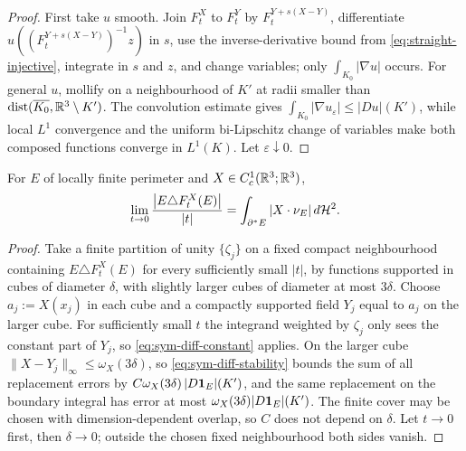 \begin{proof}
First take $u$ smooth.  Join $F^X_t$ to $F^Y_t$ by $F^{Y+s(X-Y)}_t$,
differentiate $u((F^{Y+s(X-Y)}_t)^{-1}z)$ in $s$, use the inverse-derivative
bound from \eqref{eq:straight-injective}, integrate in $s$ and $z$, and change
variables; only $\int_{K_0}|\nabla u|$ occurs.  For general $u$, mollify on a
neighbourhood of $K'$ at radii smaller than
$\operatorname{dist}(\overline{K_0},\mathbb R^3\setminus K')$.  The convolution estimate gives
$\int_{K_0}|\nabla u_\varepsilon|\le |Du|(K')$, while local $L^1$
convergence and the uniform bi-Lipschitz change of variables make both
composed functions converge in $L^1(K)$.  Let $\varepsilon\downarrow0$.
\end{proof}

\begin{theorem}\label{thm:sym-diff}
For $E$ of locally finite perimeter and $X\in C^1_c(\mathbb R^3;\mathbb R^3)$,
\begin{equation}\label{eq:sym-diff}
  \lim_{t\to0}\frac{\bigl|E\triangle F^X_t(E)\bigr|}{|t|}
  =\int_{\partial^* E}|X\cdot\nu_E|\,d\mathcal H^2 .
\end{equation}
\end{theorem}

\begin{proof}
Take a finite partition of unity $\{\zeta_j\}$ on a fixed compact
neighbourhood containing $E\triangle F_t^X(E)$ for every sufficiently small
$|t|$, by functions
supported in cubes of diameter $\delta$, with slightly larger cubes of
diameter at most $3\delta$.  Choose $a_j:=X(x_j)$ in each cube and a
compactly supported field $Y_j$ equal to $a_j$ on the larger cube.  For
sufficiently small $t$ the integrand weighted by $\zeta_j$ only sees the
constant part of $Y_j$, so \eqref{eq:sym-diff-constant} applies.  On the
larger cube $\|X-Y_j\|_\infty\le\omega_X(3\delta)$, so
\eqref{eq:sym-diff-stability} bounds the sum of all replacement errors by
$C\omega_X(3\delta)\,|D\mathbf 1_{E}|(K')$, and the same replacement on the boundary
integral has error at most $\omega_X(3\delta)|D\mathbf 1_{E}|(K')$.  The finite cover
may be chosen with dimension-dependent overlap, so $C$ does not depend on
$\delta$.  Let $t\to0$ first, then $\delta\to0$; outside the chosen fixed
neighbourhood both sides vanish.
\end{proof}

